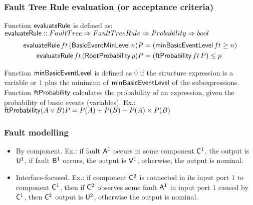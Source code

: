 \begin{frame}
\frametitle{Fault Tree Rule evaluation (or acceptance criteria)}


Function $\operatorname{\mathsf{evaluateRule}}$ is defined as:
$\operatorname{\mathsf{evaluateRule}} :: FaultTree \Rightarrow FaultTreeRule \Rightarrow Probability \Rightarrow bool$
{
\footnotesize 
\begin{subequations}
\begin{align}
\operatorname{\mathsf{evaluateRule}} ft \, (\operatorname{\mathsf{BasicEventMinLevel}} n) P &= (\operatorname{\mathsf{minBasicEventLevel}} ft \ge n)\\
\operatorname{\mathsf{evaluateRule}} ft \, (\operatorname{\mathsf{RootProbability}} p) P &= (\operatorname{\mathsf{ftProbability}} ft \, P) \le p
\end{align}
\end{subequations}
}

Function $\operatorname{\mathsf{minBasicEventLevel}}$ is defined as $0$ if the structure expression is a variable or $1$ plus the minimum of $\operatorname{\mathsf{minBasicEventLevel}}$ of the subexpressions.
%
Function $\operatorname{\mathsf{ftProbability}}$ calculates the probability of an expression, given the probability of basic events (variables). Ex.: $\operatorname{\mathsf{ftProbability}} (A \lor B) P = P(A) + P(B) - P(A) \times P(B)$
\end{frame}

\begin{frame}
\frametitle{Fault modelling}

\begin{itemize}
  \item By component. Ex.: if fault $\mathsf{A}^{1}$ occurs in some component $\mathsf{C}^{1}$, the output is $\mathsf{U}^{1}$, if fault $\mathsf{B}^{1}$ occurs, the output is $\mathsf{V}^{1}$, otherwise, the output is nominal.
  \item Interface-focused. Ex.: if component $\mathsf{C}^{2}$ is connected in its input port $1$ to component $\mathsf{C}^{1}$, then if $\mathsf{C}^{2}$ observes some fault $\mathsf{A}^{1}$ in input port $1$ caused by $\mathsf{C}^{1}$, then $\mathsf{C}^{2}$ output is $\mathsf{U}^{2}$, otherwise the output is nominal.
\end{itemize}

\end{frame}

